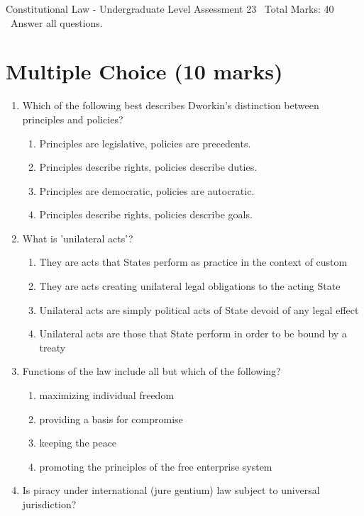 \documentclass[12pt]{article}
\begin{document}
\begin{center}
Constitutional Law - Undergraduate Level Assessment 23 \
Total Marks: 40 \
Answer all questions.
\end{center}

\section*{Multiple Choice (10 marks)}
\begin{enumerate}[label=\arabic*.]
\item Which of the following best describes Dworkin's distinction between principles and policies?
\begin{enumerate}[label=(\alph*)]
    \item Principles are legislative, policies are precedents.
    \item Principles describe rights, policies describe duties.
    \item Principles are democratic, policies are autocratic.
    \item Principles describe rights, policies describe goals.
\end{enumerate}
\item What is 'unilateral acts'?
\begin{enumerate}[label=(\alph*)]
    \item They are acts that States perform as practice in the context of custom
    \item They are acts creating unilateral legal obligations to the acting State
    \item Unilateral acts are simply political acts of State devoid of any legal effect
    \item Unilateral acts are those that State perform in order to be bound by a treaty
\end{enumerate}
\item Functions of the law include all but which of the following?
\begin{enumerate}[label=(\alph*)]
    \item maximizing individual freedom
    \item providing a basis for compromise
    \item keeping the peace
    \item promoting the principles of the free enterprise system
\end{enumerate}
\item Is piracy under international (jure gentium) law subject to universal jurisdiction?

\end{enumerate}
\end{document}
